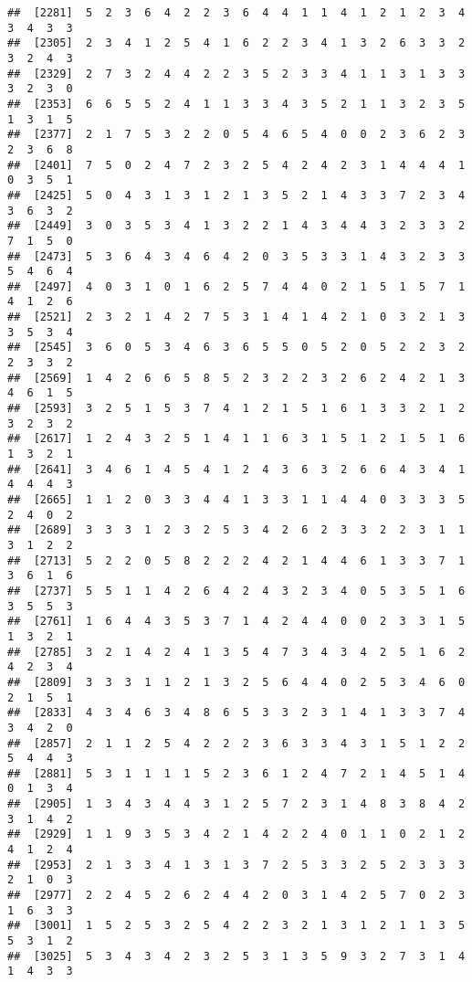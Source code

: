\documentclass[
]{article}
\begin{document}
\begin{verbatim}
##  [2281]  5  2  3  6  4  2  2  3  6  4  4  1  1  4  1  2  1  2  3  4  3  4  3  3
##  [2305]  2  3  4  1  2  5  4  1  6  2  2  3  4  1  3  2  6  3  3  2  3  2  4  3
##  [2329]  2  7  3  2  4  4  2  2  3  5  2  3  3  4  1  1  3  1  3  3  3  2  3  0
##  [2353]  6  6  5  5  2  4  1  1  3  3  4  3  5  2  1  1  3  2  3  5  1  3  1  5
##  [2377]  2  1  7  5  3  2  2  0  5  4  6  5  4  0  0  2  3  6  2  3  2  3  6  8
##  [2401]  7  5  0  2  4  7  2  3  2  5  4  2  4  2  3  1  4  4  4  1  0  3  5  1
##  [2425]  5  0  4  3  1  3  1  2  1  3  5  2  1  4  3  3  7  2  3  4  3  6  3  2
##  [2449]  3  0  3  5  3  4  1  3  2  2  1  4  3  4  4  3  2  3  3  2  7  1  5  0
##  [2473]  5  3  6  4  3  4  6  4  2  0  3  5  3  3  1  4  3  2  3  3  5  4  6  4
##  [2497]  4  0  3  1  0  1  6  2  5  7  4  4  0  2  1  5  1  5  7  1  4  1  2  6
##  [2521]  2  3  2  1  4  2  7  5  3  1  4  1  4  2  1  0  3  2  1  3  3  5  3  4
##  [2545]  3  6  0  5  3  4  6  3  6  5  5  0  5  2  0  5  2  2  3  2  2  3  3  2
##  [2569]  1  4  2  6  6  5  8  5  2  3  2  2  3  2  6  2  4  2  1  3  4  6  1  5
##  [2593]  3  2  5  1  5  3  7  4  1  2  1  5  1  6  1  3  3  2  1  2  3  2  3  2
##  [2617]  1  2  4  3  2  5  1  4  1  1  6  3  1  5  1  2  1  5  1  6  1  3  2  1
##  [2641]  3  4  6  1  4  5  4  1  2  4  3  6  3  2  6  6  4  3  4  1  4  4  4  3
##  [2665]  1  1  2  0  3  3  4  4  1  3  3  1  1  4  4  0  3  3  3  5  2  4  0  2
##  [2689]  3  3  3  1  2  3  2  5  3  4  2  6  2  3  3  2  2  3  1  1  3  1  2  2
##  [2713]  5  2  2  0  5  8  2  2  2  4  2  1  4  4  6  1  3  3  7  1  3  6  1  6
##  [2737]  5  5  1  1  4  2  6  4  2  4  3  2  3  4  0  5  3  5  1  6  3  5  5  3
##  [2761]  1  6  4  4  3  5  3  7  1  4  2  4  4  0  0  2  3  3  1  5  1  3  2  1
##  [2785]  3  2  1  4  2  4  1  3  5  4  7  3  4  3  4  2  5  1  6  2  4  2  3  4
##  [2809]  3  3  3  1  1  2  1  3  2  5  6  4  4  0  2  5  3  4  6  0  2  1  5  1
##  [2833]  4  3  4  6  3  4  8  6  5  3  3  2  3  1  4  1  3  3  7  4  3  4  2  0
##  [2857]  2  1  1  2  5  4  2  2  2  3  6  3  3  4  3  1  5  1  2  2  5  4  4  3
##  [2881]  5  3  1  1  1  1  5  2  3  6  1  2  4  7  2  1  4  5  1  4  0  1  3  4
##  [2905]  1  3  4  3  4  4  3  1  2  5  7  2  3  1  4  8  3  8  4  2  3  1  4  2
##  [2929]  1  1  9  3  5  3  4  2  1  4  2  2  4  0  1  1  0  2  1  2  4  1  2  4
##  [2953]  2  1  3  3  4  1  3  1  3  7  2  5  3  3  2  5  2  3  3  3  2  1  0  3
##  [2977]  2  2  4  5  2  6  2  4  4  2  0  3  1  4  2  5  7  0  2  3  1  6  3  3
##  [3001]  1  5  2  5  3  2  5  4  2  2  3  2  1  3  1  2  1  1  3  5  5  3  1  2
##  [3025]  5  3  4  3  4  2  3  2  5  3  1  3  5  9  3  2  7  3  1  4  1  4  3  3

\end{verbatim}
\end{document}
